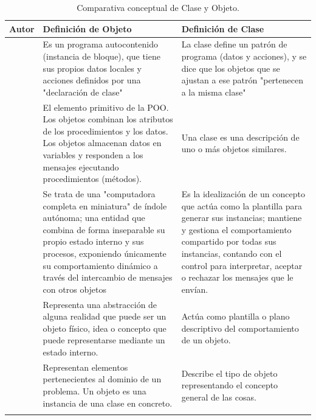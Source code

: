 \begin{longtable}{|p{3cm}|p{5.5cm}|p{5.5cm}|}
  
  \hline
  \textbf{Autor} & \textbf{Definición de Objeto} & 
  \textbf{Definición de Clase} \\ \hline
  \endhead 
  
  \textcite{Dahl1970} & 
  Es un programa autocontenido (instancia de bloque), que tiene sus propios 
  datos locales y acciones definidos por una "declaración de clase" & 

  La clase define un patrón de programa (datos y acciones), y se dice que los 
  objetos que se ajustan a ese patrón "pertenecen a la misma clase" \\ \hline
  
  \textcite{Stefik1986} & 
  El elemento primitivo de la POO. Los objetos combinan los atributos de los 
  procedimientos y los datos. Los objetos almacenan datos en variables y 
  responden a los mensajes ejecutando procedimientos (métodos). & 

  Una clase es una descripción de uno o más objetos similares. \\ \hline
  
  \textcite{Kay1993} & 
  Se trata de una "computadora completa en miniatura" de índole autónoma; una 
  entidad que combina de forma inseparable su propio estado interno y sus 
  procesos, exponiendo únicamente su comportamiento dinámico a través del 
  intercambio de mensajes con otros objetos & 

  Es la idealización de un concepto que actúa como la plantilla para generar 
  sus instancias; mantiene y gestiona el comportamiento compartido por todas 
  sus instancias, contando con el control para interpretar, aceptar o rechazar 
  los mensajes que le envían. 
  \\ \hline
  
 \textcite{Wiener2000} & 
  Representa una abstracción de alguna realidad que puede ser un objeto físico, 
  idea o concepto que puede representarse mediante un estado   interno. & 

  Actúa como plantilla o plano descriptivo del comportamiento de un objeto. 
  \\ \hline
  
  \textcite{Barnes2013} & 
  Representan elementos pertenecientes al dominio de un problema. Un objeto 
  es una instancia de una clase en concreto. & 
  Describe el tipo de objeto representando el concepto general de las cosas. 
  \\ \hline

  \noalign{\vspace{6pt}}
  \caption{Comparativa conceptual de Clase y Objeto.} \label{tab:2.1} \\ 
\end{longtable}
\vspace{-1em}

